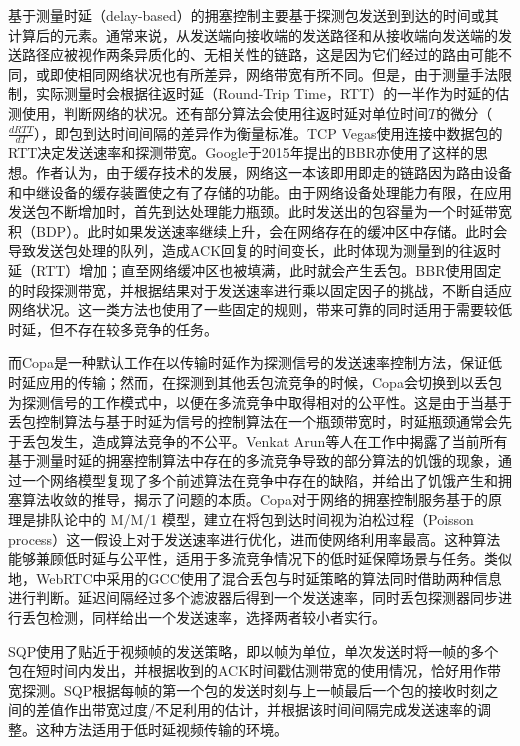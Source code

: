 基于测量时延（delay-based）的拥塞控制主要基于探测包发送到到达的时间或其计算后的元素。通常来说，从发送端向接收端的发送路径和从接收端向发送端的发送路径应被视作两条异质化的、无相关性的链路，这是因为它们经过的路由可能不同，或即使相同网络状况也有所差异，网络带宽有所不同。但是，由于测量手法限制，实际测量时会根据往返时延（Round-Trip Time，RTT）的一半作为时延的估测使用，判断网络的状况。还有部分算法会使用往返时延对单位时间$T$的微分（$\frac{dRTT}{dT}$），即包到达时间间隔的差异作为衡量标准。TCP Vegas\cite{brakmo1994tcp}使用连接中数据包的RTT决定发送速率和探测带宽。Google于2015年提出的BBR\cite{cardwell2016bbr}亦使用了这样的思想。作者认为，由于缓存技术的发展，网络这一本该即用即走的链路因为路由设备和中继设备的缓存装置使之有了存储的功能。由于网络设备处理能力有限，在应用发送包不断增加时，首先到达处理能力瓶颈。此时发送出的包容量为一个时延带宽积（BDP）。此时如果发送速率继续上升，会在网络存在的缓冲区中存储。此时会导致发送包处理的队列，造成ACK回复的时间变长，此时体现为测量到的往返时延（RTT）增加；直至网络缓冲区也被填满，此时就会产生丢包。BBR使用固定的时段探测带宽，并根据结果对于发送速率进行乘以固定因子的挑战，不断自适应网络状况。这一类方法也使用了一些固定的规则，带来可靠的同时适用于需要较低时延，但不存在较多竞争的任务。

而Copa\cite{arun2018copa}是一种默认工作在以传输时延作为探测信号的发送速率控制方法，保证低时延应用的传输；然而，在探测到其他丢包流竞争的时候，Copa会切换到以丢包为探测信号的工作模式中，以便在多流竞争中取得相对的公平性。这是由于当基于丢包控制算法与基于时延为信号的控制算法在一个瓶颈带宽时，时延瓶颈通常会先于丢包发生，造成算法竞争的不公平。Venkat Arun等人在工作\cite{arun2022starvation}中揭露了当前所有基于测量时延的拥塞控制算法中存在的多流竞争导致的部分算法的饥饿的现象，通过一个网络模型复现了多个前述算法在竞争中存在的缺陷，并给出了饥饿产生和拥塞算法收敛的推导，揭示了问题的本质。Copa对于网络的拥塞控制服务基于的原理是排队论中的 M/M/1 模型，建立在将包到达时间视为泊松过程（Poisson process）这一假设上对于发送速率进行优化，进而使网络利用率最高。这种算法能够兼顾低时延与公平性，适用于多流竞争情况下的低时延保障场景与任务。类似地，WebRTC中采用的GCC\cite{carlucci2016analysis}使用了混合丢包与时延策略的算法同时借助两种信息进行判断。延迟间隔经过多个滤波器后得到一个发送速率，同时丢包探测器同步进行丢包检测，同样给出一个发送速率，选择两者较小者实行。

SQP\cite{ray2022sqp}使用了贴近于视频帧的发送策略，即以帧为单位，单次发送时将一帧的多个包在短时间内发出，并根据收到的ACK时间戳估测带宽的使用情况，恰好用作带宽探测。SQP根据每帧的第一个包的发送时刻与上一帧最后一个包的接收时刻之间的差值作出带宽过度/不足利用的估计，并根据该时间间隔完成发送速率的调整。这种方法适用于低时延视频传输的环境。

